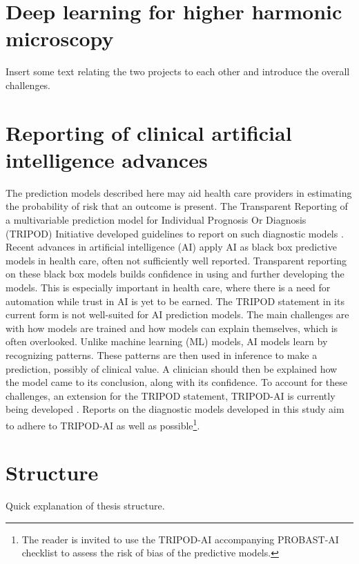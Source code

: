 \section{Deep learning for higher harmonic microscopy}
Insert some text relating the two projects to each other and introduce the overall challenges.

\section{Reporting of clinical artificial intelligence advances}
The prediction models described here may aid health care providers in estimating the probability of risk that an outcome is present.
The Transparent Reporting of a multivariable prediction model for Individual Prognosis Or Diagnosis (TRIPOD) Initiative developed guidelines to report on such diagnostic models \cite{Collins2015, Moons2015}.
Recent advances in artificial intelligence (AI) apply AI as black box predictive models in health care, often not sufficiently well reported.
Transparent reporting on these black box models builds confidence in using and further developing the models.
This is especially important in health care, where there is a need for automation while trust in AI is yet to be earned.
The TRIPOD statement in its current form is not well-suited for AI prediction models.
The main challenges are with how models are trained and how models can explain themselves, which is often overlooked.
Unlike machine learning (ML) models, AI models learn by recognizing patterns.
These patterns are then used in inference to make a prediction, possibly of clinical value.
A clinician should then be explained how the model came to its conclusion, along with its confidence.
To account for these challenges, an extension for the TRIPOD statement, TRIPOD-AI is currently being developed \cite{Collins2021,Collins2020}.
Reports on the diagnostic models developed in this study aim to adhere to TRIPOD-AI as well as possible\footnote{The reader is invited to use the TRIPOD-AI accompanying PROBAST-AI \cite{Wolff2019a, Wolff2019b, Collins2021} checklist to assess the risk of bias of the predictive models.}.

\section{Structure}
Quick explanation of thesis structure.
